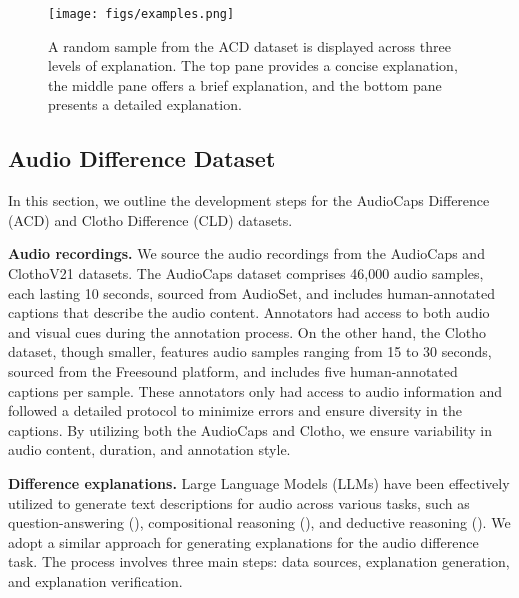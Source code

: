 \begin{wrapfigure}[19]{r}{0.5\textwidth}
\begin{center}
     \vspace{-0.2in}
     \texttt{[image: figs/examples.png]}
     \caption{\small A random sample from the ACD dataset is displayed across three levels of explanation. The top pane provides a concise explanation, the middle pane offers a brief explanation, and the bottom pane presents a detailed explanation.
     \vspace{-0.2in}
     }
     \label{fig:examples}
\end{center}
\end{wrapfigure}

\subsection{Audio Difference Dataset} \vspace{-0.1in} \label{sec: audio difference dataset}
In this section, we outline the development steps for the AudioCaps Difference (ACD) and Clotho Difference (CLD) datasets.

\noindent \textbf{Audio recordings.} We source the audio recordings from the AudioCaps and ClothoV21 datasets. The AudioCaps dataset comprises 46,000 audio samples, each lasting 10 seconds, sourced from AudioSet, and includes human-annotated captions that describe the audio content. Annotators had access to both audio and visual cues during the annotation process. On the other hand, the Clotho dataset, though smaller, features audio samples ranging from 15 to 30 seconds, sourced from the Freesound platform, and includes five human-annotated captions per sample. These annotators only had access to audio information and followed a detailed protocol to minimize errors and ensure diversity in the captions. By utilizing both the AudioCaps and Clotho, we ensure variability in audio content, duration, and annotation style.

\noindent \textbf{Difference explanations.} 
Large Language Models (LLMs) have been effectively utilized to generate text descriptions for audio across various tasks, such as question-answering (\cite{ltu}), compositional reasoning (\cite{compa,ghosh2024gama}), and deductive reasoning (\cite{audioentail}). We adopt a similar approach for generating explanations for the audio difference task. The process involves three main steps: data sources, explanation generation, and explanation verification.


